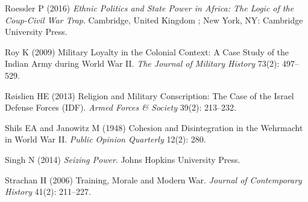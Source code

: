 \documentclass[
  12pt,
]{article}
\newlength{\cslhangindent}
\newenvironment{cslreferences}%
  {\setlength{\parindent}{0pt}%
  \everypar{\setlength{\hangindent}{\cslhangindent}}\ignorespaces}%
  {\par}
\begin{document}
\begin{cslreferences}
\leavevmode\hypertarget{ref-Roessler2016}{}%
Roessler P (2016) \emph{Ethnic Politics and State Power in Africa: The Logic of the Coup-Civil War Trap}. Cambridge, United Kingdom ; New York, NY: Cambridge University Press.

\leavevmode\hypertarget{ref-Roy2009}{}%
Roy K (2009) Military Loyalty in the Colonial Context: A Case Study of the Indian Army during World War II. \emph{The Journal of Military History} 73(2): 497--529.

\leavevmode\hypertarget{ref-Roislien2013}{}%
Røislien HE (2013) Religion and Military Conscription: The Case of the Israel Defense Forces (IDF). \emph{Armed Forces \& Society} 39(2): 213--232.

\leavevmode\hypertarget{ref-Shils1948}{}%
Shils EA and Janowitz M (1948) Cohesion and Disintegration in the Wehrmacht in World War II. \emph{Public Opinion Quarterly} 12(2): 280.

\leavevmode\hypertarget{ref-Singh2014}{}%
Singh N (2014) \emph{Seizing Power}. Johns Hopkins University Press.

\leavevmode\hypertarget{ref-Strachan2006}{}%
Strachan H (2006) Training, Morale and Modern War. \emph{Journal of Contemporary History} 41(2): 211--227.
\end{cslreferences}
\end{document}
